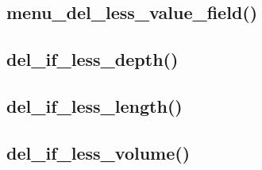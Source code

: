 \documentclass[12pt, a4paper]{article}
\begin{document}






\subsection{menu\_del\_less\_value\_field()}







\subsection{del\_if\_less\_depth()}







\subsection{del\_if\_less\_length()}







\subsection{del\_if\_less\_volume()}
\end{document}
